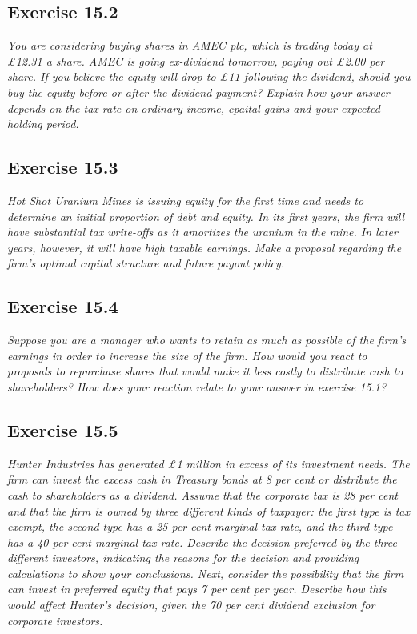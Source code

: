 \documentclass[]{book}
\theoremstyle{definition}
\theoremstyle{definition}
\theoremstyle{remark}
\begin{document}
\subsection{Exercise 15.2}\label{exercise-15.2}

\emph{You are considering buying shares in AMEC plc, which is trading
today at £12.31 a share. AMEC is going ex-dividend tomorrow, paying out
£2.00 per share. If you believe the equity will drop to £11 following
the dividend, should you buy the equity before or after the dividend
payment? Explain how your answer depends on the tax rate on ordinary
income, cpaital gains and your expected holding period.}
\citep[p.518]{book}

\subsection{Exercise 15.3}\label{exercise-15.3}

\emph{Hot Shot Uranium Mines is issuing equity for the first time and
needs to determine an initial proportion of debt and equity. In its
first years, the firm will have substantial tax write-offs as it
amortizes the uranium in the mine. In later years, however, it will have
high taxable earnings. Make a proposal regarding the firm's optimal
capital structure and future payout policy.} \citep[p.518]{book}

\subsection{Exercise 15.4}\label{exercise-15.4}

\emph{Suppose you are a manager who wants to retain as much as possible
of the firm's earnings in order to increase the size of the firm. How
would you react to proposals to repurchase shares that would make it
less costly to distribute cash to shareholders? How does your reaction
relate to your answer in exercise 15.1?} \citep[p.518]{book}

\subsection{Exercise 15.5}\label{exercise-15.5}

\emph{Hunter Industries has generated £1 million in excess of its
investment needs. The firm can invest the excess cash in Treasury bonds
at 8 per cent or distribute the cash to shareholders as a dividend.
Assume that the corporate tax is 28 per cent and that the firm is owned
by three different kinds of taxpayer: the first type is tax exempt, the
second type has a 25 per cent marginal tax rate, and the third type has
a 40 per cent marginal tax rate. Describe the decision preferred by the
three different investors, indicating the reasons for the decision and
providing calculations to show your conclusions. Next, consider the
possibility that the firm can invest in preferred equity that pays 7 per
cent per year. Describe how this would affect Hunter's decision, given
the 70 per cent dividend exclusion for corporate investors.}
\citep[p.518]{book}
\end{document}
